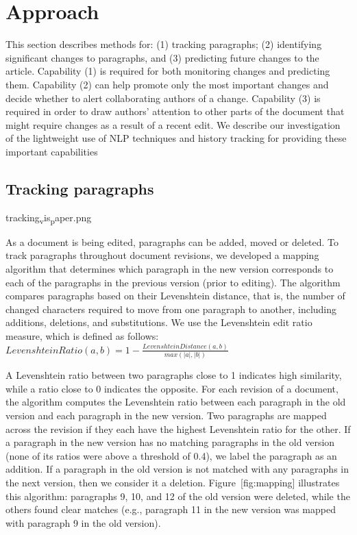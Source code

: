 \section{Approach}\label{approach}

This section describes methods for: (1) tracking paragraphs; (2)
identifying significant changes to paragraphs, and (3) predicting future
changes to the article. Capability (1) is required for both monitoring
changes and predicting them. Capability (2) can help promote only the
most important changes and decide whether to alert collaborating authors
of a change. Capability (3) is required in order to draw authors'
attention to other parts of the document that might require changes as a
result of a recent edit. We describe our investigation of the
lightweight use of NLP techniques and history tracking for providing
these important capabilities

\subsection{Tracking paragraphs}\label{tracking-paragraphs}

tracking\textsubscript{v}is\textsubscript{p}aper.png

As a document is being edited, paragraphs can be added, moved or
deleted. To track paragraphs throughout document revisions, we developed
a mapping algorithm that determines which paragraph in the new version
corresponds to each of the paragraphs in the previous version (prior to
editing). The algorithm compares paragraphs based on their Levenshtein
distance, that is, the number of changed characters required to move
from one paragraph to another, including additions, deletions, and
substitutions. We use the Levenshtein edit ratio measure, which is
defined as follows:
\(Levenshtein Ratio(a,b) = 1-\frac{Levenshtein Distance(a,b)}{max(|a|,|b|)} \)

A Levenshtein ratio between two paragraphs close to 1 indicates high
similarity, while a ratio close to 0 indicates the opposite. For each
revision of a document, the algorithm computes the Levenshtein ratio
between each paragraph in the old version and each paragraph in the new
version. Two paragraphs are mapped across the revision if they each have
the highest Levenshtein ratio for the other. If a paragraph in the new
version has no matching paragraphs in the old version (none of its
ratios were above a threshold of 0.4), we label the paragraph as an
addition. If a paragraph in the old version is not matched with any
paragraphs in the next version, then we consider it a deletion.
Figure~{[}fig:mapping{]} illustrates this algorithm: paragraphs 9, 10,
and 12 of the old version were deleted, while the others found clear
matches (e.g., paragraph 11 in the new version was mapped with paragraph
9 in the old version).

